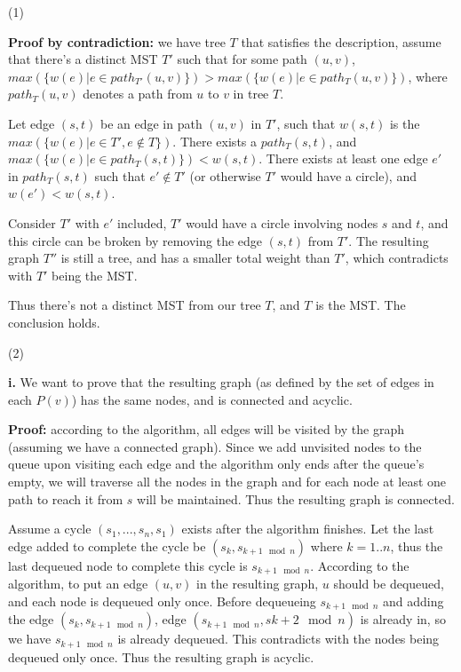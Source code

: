 \documentclass{article}
\begin{document}
\begin{description}
  (1)

  \textbf{Proof by contradiction:} we have tree $T$ that satisfies the description, assume that there's a distinct MST $T'$ such that for some path $(u,v)$, $max(\{w(e) | e \in path_{T'}(u,v)\}) > max(\{w(e) | e \in path_{T}(u,v)\})$, where $path_{T}(u,v)$ denotes a path from $u$ to $v$ in tree $T$.

  Let edge $(s,t)$ be an edge in path $(u,v)$ in $T'$, such that $w(s,t)$ is the $max(\{w(e) | e \in T', e \notin T\})$. There exists a $path_{T}(s,t)$, and $max(\{w(e) | e \in path_{T}(s,t)\}) < w(s,t)$. There exists at least one edge $e'$ in $path_{T}(s,t)$ such that $e' \notin T'$ (or otherwise $T'$ would have a circle), and $w(e') < w(s,t)$. 

  Consider $T'$ with $e'$ included, $T'$ would have a circle involving nodes $s$ and $t$, and this circle can be broken by removing the edge $(s,t)$ from $T'$. The resulting graph $T''$ is still a tree, and has a smaller total weight than $T'$, which contradicts with $T'$ being the MST.

  Thus there's not a distinct MST from our tree $T$, and $T$ is the MST. The conclusion holds.

  (2)

  \textbf{i.} We want to prove that the resulting graph (as defined by the set of edges in each $P(v)$) has the same nodes, and is connected and acyclic.

  \textbf{Proof:} according to the algorithm, all edges will be visited by the graph (assuming we have a connected graph). Since we add unvisited nodes to the queue upon visiting each edge and the algorithm only ends after the queue's empty, we will traverse all the nodes in the graph and for each node at least one path to reach it from $s$ will be maintained. Thus the resulting graph is connected.

  Assume a cycle $(s_1,..., s_n, s_1)$ exists after the algorithm finishes. Let the last edge added to complete the cycle be $(s_k, s_{k+1 \mod n})$ where $k=1..n$, thus the last dequeued node to complete this cycle is $s_{k+1 \mod n}$. According to the algorithm, to put an edge $(u,v)$ in the resulting graph, $u$ should be dequeued, and each node is dequeued only once. Before dequeueing $s_{k+1 \mod n}$ and adding the edge $(s_k, s_{k+1 \mod n})$, edge $(s_{k+1 \mod n}, s{k+2 \mod n})$ is already in, so we have $s_{k+1 \mod n}$ is already dequeued. This contradicts with the nodes being dequeued only once. Thus the resulting graph is acyclic.


\end{description}
\end{document}
